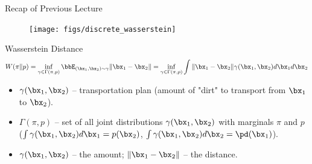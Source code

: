 \documentclass{beamer}
\begin{document}
\begin{frame}{Recap of Previous Lecture}
	\begin{figure}
		\centering
		\texttt{[image: figs/discrete\_wasserstein]}
	\end{figure}
	\vspace{-0.3cm}
	\begin{block}{Wasserstein Distance}
		\vspace{-0.7cm}
		{\small
		\[
		W(\pi \| p) = \inf_{\gamma \in \Gamma(\pi, p)} \bbE_{(\bx_1, \bx_2) \sim \gamma} \| \bx_1 - \bx_2 \| =  \inf_{\gamma \in \Gamma(\pi, p)} \int \| \bx_1 - \bx_2 \| \gamma (\bx_1, \bx_2) d \bx_1 d \bx_2
		\]
		}
		\vspace{-0.5cm}
		\begin{itemize}
			\item $\gamma(\bx_1, \bx_2)$ -- transportation plan (amount of "dirt" to transport from $\bx_1$ to $\bx_2$).
			\item $\Gamma(\pi, p)$ -- set of all joint distributions $\gamma (\bx_1, \bx_2)$ with marginals $\pi$ and $p$ ($\int \gamma(\bx_1, \bx_2) d \bx_1 = p(\bx_2)$, $\int \gamma(\bx_1, \bx_2) d \bx_2 = \pd(\bx_1)$).
			\item $\gamma(\bx_1, \bx_2)$ -- the amount; $\|\bx_1 - \bx_2 \|$ -- the distance.
		\end{itemize}
	\end{block}
\end{frame}
\end{document}
